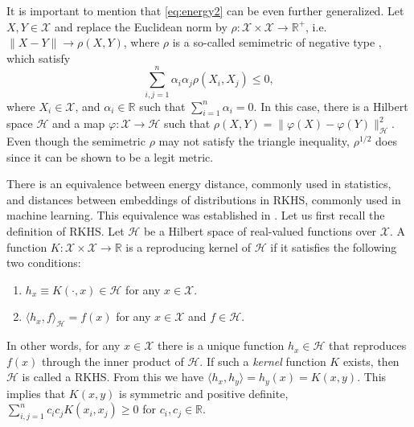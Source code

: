 \documentclass{article}
\newcommand\kk{K}
\newcommand\kkk{h}
\newcommand\HH{\mathcal{H}}
\begin{document}
It is important to 
mention that \eqref{eq:energy2} can be even further generalized.
Let $X, Y \in \mathcal{X}$ and replace the Euclidean norm by
$\rho: \mathcal{X}\times\mathcal{X} \to \mathbb{R}^+$, i.e.
$\| X - Y\| \to \rho(X,Y)$, where $\rho$ is a so-called semimetric
of negative type \cite{Sejdinovic2013}, which satisfy
\begin{equation}
\label{eq:negative_type}
\sum_{i,j=1}^n \alpha_i \alpha_j \rho(X_i, X_j) \le 0,
\end{equation}
where $X_i \in \mathcal{X}$, and $\alpha_i \in \mathbb{R}$ such that
$\sum_{i=1}^n \alpha_i = 0$.
In this case, there is a Hilbert space $\mathcal{H}$ and
a map $\varphi: \mathcal{X} \to
\mathcal{H}$ such that
$\rho(X, Y) = \| \varphi(X) - \varphi(Y) \|_{\mathcal{H}}^2$. 
Even though the semimetric 
$\rho$ may not satisfy the triangle inequality, 
$\rho^{1/2}$ does since it can be shown to be a legit metric. 

There is an equivalence between energy distance, 
commonly used in statistics,
and distances between embeddings of distributions in 
RKHS, commonly used in machine learning. 
This equivalence was established
in \cite{Sejdinovic2013}. Let us first recall the definition of
RKHS. Let $\HH$ be a Hilbert space of real-valued functions
over $\mathcal{X}$. A function 
$\kk : \mathcal{X} \times \mathcal{X} \to 
\mathbb{R}$ is a reproducing kernel of $\HH$ if it satisfies
the following two conditions:
\begin{enumerate}
\item $\kkk_x \equiv \kk(\cdot, x) \in \HH$ 
for any $x \in \mathcal{X}$.
\item $\langle \kkk_x, f \rangle_{\HH} = f(x)$ for
any $x\in\mathcal{X}$ and $f\in \HH$.
\end{enumerate}
In other words, for any $x \in \mathcal{X}$ there is a unique function
$\kkk_x \in \HH$ that reproduces $f(x)$ through the inner product
of $\HH$.
If such a \emph{kernel} 
function $\kk$ exists, then $\HH$ is called a RKHS.
From this we have $\langle \kkk_x, \kkk_y \rangle = \kkk_y(x) = \kk(x,y)$. 
This implies
that $\kk(x,y)$ is symmetric and positive definite, 
$\sum_{i,j=1}^n c_i c_j
\kk(x_i,x_j) \ge 0$ for $c_i,c_j \in \mathbb{R}$.
\end{document}
